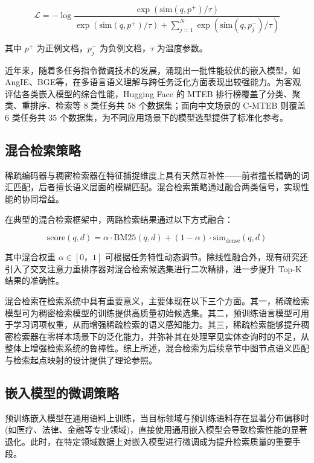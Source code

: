 \documentclass[promaster, vlined]{DissertUESTC}
\begin{document}
\begin{equation}
\mathcal{L} = -\log \frac{\exp(\text{sim}(q, p^+) / \tau)}{\exp(\text{sim}(q, p^+) / \tau) + \sum_{j=1}^{N} \exp(\text{sim}(q, p_j^-) / \tau)}
\end{equation}

其中 $p^+$ 为正例文档，$p_j^-$ 为负例文档，$\tau$ 为温度参数。

近年来，随着多任务指令微调技术的发展，涌现出一批性能较优的嵌入模型，如 AngIE\cite{li2023angle}、BGE\cite{bge2023embedding}等，在多语言语义理解与跨任务泛化方面表现出较强能力。为客观评估各类嵌入模型的综合性能，Hugging Face 的 MTEB 排行榜\cite{muennighoff2022mteb}覆盖了分类、聚类、重排序、检索等 8 类任务共 58 个数据集；面向中文场景的 C-MTEB 则覆盖 6 类任务共 35 个数据集，为不同应用场景下的模型选型提供了标准化参考。

\subsection{混合检索策略}

稀疏编码器与稠密检索器在特征捕捉维度上具有天然互补性——前者擅长精确的词汇匹配，后者擅长语义层面的模糊匹配。混合检索策略通过融合两类信号，实现性能的协同增益\cite{ma2021replication}。

在典型的混合检索框架中，两路检索结果通过以下方式融合：

\begin{equation}
\text{score}(q, d) = \alpha \cdot \text{BM25}(q, d) + (1 - \alpha) \cdot \text{sim}_{\text{dense}}(q, d)
\end{equation}

其中混合权重 $\alpha \in [0，1]$ 可根据任务特性动态调节。除线性融合外，现有研究还引入了交叉注意力重排序器对混合检索候选集进行二次精排，进一步提升 Top-K 结果的准确性。

混合检索在检索系统中具有重要意义，主要体现在以下三个方面。其一，稀疏检索模型可为稠密检索模型的训练提供高质量初始候选集。其二，预训练语言模型可用于学习词项权重，从而增强稀疏检索的语义感知能力。其三，稀疏检索能够提升稠密检索器在零样本场景下的泛化能力，并弥补其在处理罕见实体查询时的不足，从整体上增强检索系统的鲁棒性\cite{chen2022densehybrid}。综上所述，混合检索为后续章节中图节点语义匹配与检索起点映射的设计提供了理论参照。

\subsection{嵌入模型的微调策略}

预训练嵌入模型在通用语料上训练，当目标领域与预训练语料存在显著分布偏移时(如医疗、法律、金融等专业领域)，直接使用通用嵌入模型会导致检索性能的显著退化。此时，在特定领域数据上对嵌入模型进行微调成为提升检索质量的重要手段\cite{lewis2020retrieval}。
\end{document}
